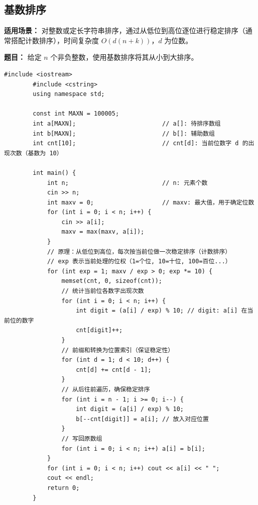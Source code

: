 \documentclass[12pt,a4paper]{ctexart}
\begin{document}
	\subsection{基数排序}
	\textbf{适用场景：} 对整数或定长字符串排序，通过从低位到高位逐位进行稳定排序（通常搭配计数排序），时间复杂度 \(O(d(n+k))\)，\(d\) 为位数。
	
	\textbf{题目：} 给定 \(n\) 个非负整数，使用基数排序将其从小到大排序。
	
	\begin{lstlisting}[caption={基数排序——按位 LSD 排序（低位优先）}]
		#include <iostream>
		#include <cstring>
		using namespace std;
		
		const int MAXN = 100005;
		int a[MAXN];                        // a[]: 待排序数组
		int b[MAXN];                        // b[]: 辅助数组
		int cnt[10];                        // cnt[d]: 当前位数字 d 的出现次数（基数为 10）
		
		int main() {
			int n;                          // n: 元素个数
			cin >> n;
			int maxv = 0;                   // maxv: 最大值，用于确定位数
			for (int i = 0; i < n; i++) {
				cin >> a[i];
				maxv = max(maxv, a[i]);
			}
			// 原理：从低位到高位，每次按当前位做一次稳定排序（计数排序）
			// exp 表示当前处理的位权（1=个位, 10=十位, 100=百位...）
			for (int exp = 1; maxv / exp > 0; exp *= 10) {
				memset(cnt, 0, sizeof(cnt));
				// 统计当前位各数字出现次数
				for (int i = 0; i < n; i++) {
					int digit = (a[i] / exp) % 10; // digit: a[i] 在当前位的数字
					cnt[digit]++;
				}
				// 前缀和转换为位置索引（保证稳定性）
				for (int d = 1; d < 10; d++) {
					cnt[d] += cnt[d - 1];
				}
				// 从后往前遍历，确保稳定排序
				for (int i = n - 1; i >= 0; i--) {
					int digit = (a[i] / exp) % 10;
					b[--cnt[digit]] = a[i]; // 放入对应位置
				}
				// 写回原数组
				for (int i = 0; i < n; i++) a[i] = b[i];
			}
			for (int i = 0; i < n; i++) cout << a[i] << " ";
			cout << endl;
			return 0;
		}
	\end{lstlisting}
	
\end{document}
